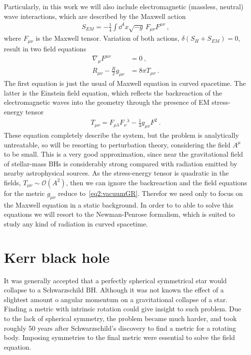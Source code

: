 Particularly, in this work we will also include electromagnetic (massless, neutral) wave interactions, which are described by the Maxwell action
\begin{align}
    S_{EM} = - \frac{1}{4} \int \dd^4 x \sqrt{-g} \,F_{\mu\nu} F^{\mu\nu} ~,
     \label{eq2:actionEM}
\end{align}
where $F_{\mu\nu}$ is the Maxwell tensor. Variation of both actions, $\delta(S_H + S_{EM}) = 0$, result in two field equations
\begin{align}
    \nabla_\mu F^{\mu\nu} &= 0 ~, \label{eq2:maxwellEM} \\
    R_{\mu\nu} - \frac{R}{2} g_{\mu\nu} &= 8 \pi T_{\mu\nu} \label{eq2:EM+GR}  ~.
\end{align}
The first equation is just the usual of Maxwell equation in curved spacetime.
The latter is the Einstein field equation, which reflects the backreaction of the electromagnetic waves into the geometry through the presence of EM stress-energy tensor
\begin{align}
    T_{\mu\nu} = F_{\mu\lambda} F_{\nu}{}^{\lambda} - \frac{1}{4} g_{\mu\nu} F^2  ~.
    \label{eq2:stressenergyEM}
\end{align}
These equation completely describe the system, but the problem is analytically untreatable, so will be resorting to perturbation theory, considering the field $A^\mu$ to be small. 
This is a very good approximation, since near the gravitational field of stellar-mass BHs  is considerably strong compared with radiation emitted by nearby astrophysical sources.
As the stress-energy tensor is quadratic in the fields, $T_{\mu\nu}\sim\mathcal{O}(A^2)$, then we can ignore the backreaction and the field equations for the metric $g_{\mu\nu}$ reduce to~\eqref{eq2:vacuumGR}.
Therefor we need only to focus on the Maxwell equation in a static background.
In order to to able to solve this equations we will resort to the Newman-Penrose formalism, which is suited to study any kind of radiation in curved spacetime.


\section{Kerr black hole}

It was generally accepted that a perfectly spherical symmetrical star would collapse to a Schwarzschild BH. Although it was not known the effect of a slightest amount o angular momentum on a gravitational collapse of a star. Finding a metric with intrinsic rotation could give insight to such problem. Due to the lack of spherical symmetry, the problem became much harder, and took roughly 50 years after Schwarzschild's discovery to find a metric for a rotating body. Imposing symmetries to the final metric were essential to solve the field equation.


